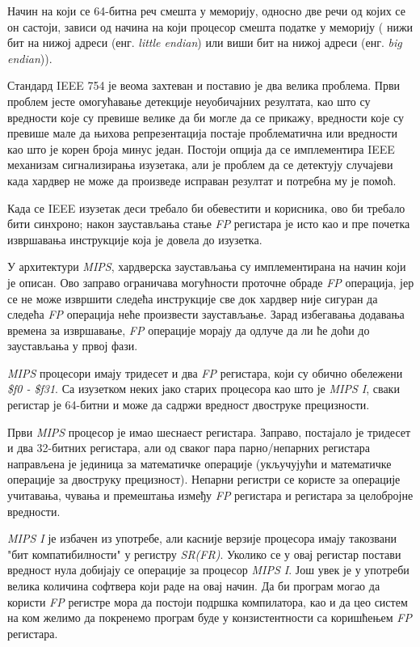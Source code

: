 \documentclass[12pt,oneside]{memoir}
\begin{document}
\indent Начин на који се 64-битна реч смешта у меморију, односно две речи од којих се он састоји, зависи од начина на који процесор смешта податке у меморију ( нижи бит на нижој адреси (енг. \textit{little endian}) или виши бит на нижој адреси (енг. \textit{big endian})). 

\indent Стандард IEEE 754 је веома захтеван и поставио је два велика проблема. Први проблем јесте омогућавање детекције неуобичајних резултата, као што су вредности које су превише велике да би могле да се прикажу, вредности које су превише мале да њихова репрезентација постаје проблематична или вредности као што је корен броја минус један. Постоји опција да се имплементира IEEE механизам сигнализирања изузетака, али је проблем да се детектују случајеви када хардвер не може да произведе исправан резултат и потребна му је помоћ.

\indent Када се IEEE изузетак деси требало би обевестити и корисника, ово би требало бити синхроно; након заустављања стање \textit{FP} регистара је исто као и пре почетка извршавања инструкције која је довела до изузетка.

\indent У архитектури \textit{MIPS}, хардверска заустављања су имплементирана на начин који је описан. Ово заправо ограничава могућности проточне обраде \textit{FP} операција, јер се не може извршити следећа инструкције све док хардвер није сигуран да следећа \textit{FP} операција неће произвести заустављање. Зарад избегавања додавања времена за извршавање, \textit{FP} операције морају да одлуче да ли ће доћи до заустављања у првој фази. 

\indent \textit{MIPS} процесори имају тридесет и два \textit{FP} регистара, који су обично обележени \textit{\$f0 - \$f31}. Са изузетком неких јако старих процесора као што је \textit{MIPS I}, сваки регистар је 64-битни и може да садржи вредност двоструке прецизности.

\indent Први \textit{MIPS} процесор је имао шеснаест регистара. Заправо, постајало је тридесет и два 32-битних регистара, али од сваког пара парно/непарних регистара направљена је јединица за математичке операције (укључујући и математичке операције за двоструку прецизност). Непарни регистри се користе за операције учитавања, чувања и премештања између \textit{FP} регистара и регистара за целобројне вредности.

\indent \textit{MIPS I} је избачен из употребе, али касније верзије процесора имају такозвани "бит компатибилности" у регистру \textit{SR(FR)}. Уколико се у овај регистар постави вредност нула добијају се операције за процесор \textit{MIPS I}. Још увек је у употреби велика количина софтвера који раде на овај начин. Да би програм могао да користи \textit{FP} регистре мора да постоји подршка компилатора, као и да цео систем на ком желимо да покренемо програм буде у конзистентности са коришћењем \textit{FP} регистара.
\end{document}
